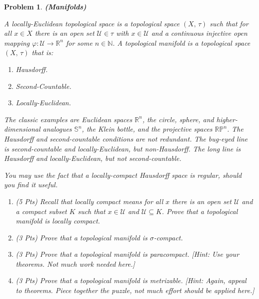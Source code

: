 \documentclass{article}
\theoremstyle{normal}
\newtheorem{problem}{Problem}
\begin{document}
    \begin{problem}
        \textbf{(Manifolds)}
        \par\hfill\par
        A locally-Euclidean topological space is a topological space
        $(X,\,\tau)$ such that for all $x\in{X}$ there is an open set
        $\mathcal{U}\in\tau$ with $x\in\mathcal{U}$ and a continuous injective
        open mapping $\varphi:\mathcal{U}\rightarrow\mathbb{R}^{n}$ for some
        $n\in\mathbb{N}$.
        A topological manifold is a topological space $(X,\,\tau)$ that is:
        \begin{enumerate}
            \item Hausdorff.
            \item Second-Countable.
            \item Locally-Euclidean.
        \end{enumerate}
        The classic examples are Euclidean spaces $\mathbb{R}^{n}$, the
        circle, sphere, and higher-dimensional analogues $\mathbb{S}^{n}$,
        the Klein bottle, and the projective spaces $\mathbb{RP}^{n}$. The
        Hausdorff and second-countable conditions are not redundant. The
        bug-eyed line is second-countable and locally-Euclidean, but
        non-Hausdorff. The long line is Hausdorff and locally-Euclidean, but
        not second-countable.
        \par\hfill\par
        You may use the fact that a locally-compact Hausdorff space is regular,
        should you find it useful.
        \begin{enumerate}
            \item (5 Pts) Recall that locally compact means for all
                $x$ there is an open set $\mathcal{U}$ and a compact subset
                $K$ such that $x\in\mathcal{U}$ and $\mathcal{U}\subseteq{K}$.
                Prove that a topological manifold is locally compact.
            \item (3 Pts) Prove that a topological manifold is $\sigma$-compact.
            \item (3 Pts) Prove that a topological manifold is paracompact.
                [Hint: Use your theorems. Not much work needed here.]
            \item (3 Pts) Prove that a topological manifold is metrizable.
                [Hint: Again, appeal to theorems. Piece together the puzzle,
                not much effort should be applied here.]
        \end{enumerate}
    \end{problem}
\end{document}

